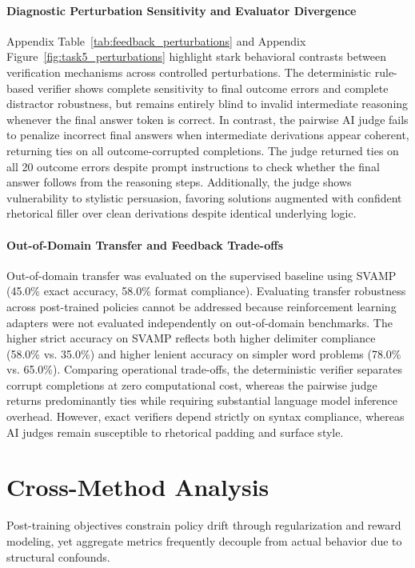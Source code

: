\documentclass{article}
\begin{document}
\paragraph{Diagnostic Perturbation Sensitivity and Evaluator Divergence}
Appendix Table~\ref{tab:feedback_perturbations} and Appendix Figure~\ref{fig:task5_perturbations} highlight stark behavioral contrasts between verification mechanisms across controlled perturbations. The deterministic rule-based verifier shows complete sensitivity to final outcome errors and complete distractor robustness, but remains entirely blind to invalid intermediate reasoning whenever the final answer token is correct. In contrast, the pairwise AI judge fails to penalize incorrect final answers when intermediate derivations appear coherent, returning ties on all outcome-corrupted completions. The judge returned ties on all 20 outcome errors despite prompt instructions to check whether the final answer follows from the reasoning steps. Additionally, the judge shows vulnerability to stylistic persuasion, favoring solutions augmented with confident rhetorical filler over clean derivations despite identical underlying logic.

\paragraph{Out-of-Domain Transfer and Feedback Trade-offs}
Out-of-domain transfer was evaluated on the supervised baseline using SVAMP (45.0\% exact accuracy, 58.0\% format compliance). Evaluating transfer robustness across post-trained policies cannot be addressed because reinforcement learning adapters were not evaluated independently on out-of-domain benchmarks. The higher strict accuracy on SVAMP reflects both higher delimiter compliance (58.0\% vs. 35.0\%) and higher lenient accuracy on simpler word problems (78.0\% vs. 65.0\%). Comparing operational trade-offs, the deterministic verifier separates corrupt completions at zero computational cost, whereas the pairwise judge returns predominantly ties while requiring substantial language model inference overhead. However, exact verifiers depend strictly on syntax compliance, whereas AI judges remain susceptible to rhetorical padding and surface style.

\section{Cross-Method Analysis}
\label{sec:cross_task}

Post-training objectives constrain policy drift through regularization and reward modeling, yet aggregate metrics frequently decouple from actual behavior due to structural confounds.
\end{document}
